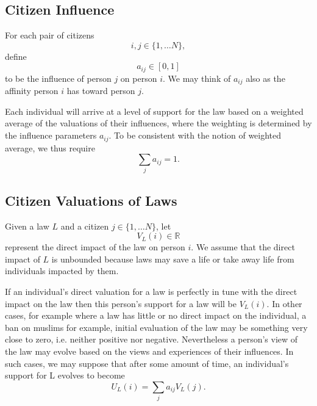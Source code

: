\subsection {Citizen Influence}
For each pair of citizens $$i,j\in\{1,\dots N\},$$ define $$a_{ij}\in [0,1]$$ to be the influence of person $j$ on person $i$.  We may think of $a_{ij}$ also as the affinity person $i$ has toward person $j$. 


Each individual will arrive at a level of support for the law based on a weighted average of the valuations of their influences, where the weighting is determined by the influence parameters $a_{ij}$. To be consistent with the notion of weighted average, we thus require $$\sum_ja_{ij}=1.$$%

\subsection{Citizen Valuations of Laws}
Given a law $L$ and a citizen $j\in\{1,\dots N\}$, %
let $$V_L(i)\in\mathbb{R}$$ represent the direct impact of the law on person $i$. We assume that the direct impact of $L$ is unbounded because laws may save a life or take away life from individuals impacted by them.

If an individual's direct valuation for a law is perfectly in tune with the direct impact on the law then this person's support for a law will be $V_L(i)$. %
In other cases, for example where a law has little or no direct impact on the individual, a ban on muslims for example, initial evaluation of the law may be something very close to zero, i.e. neither positive nor negative.  Nevertheless a person's view of the law may evolve based on the views and experiences of their influences.  In such cases, we may suppose that after some amount of time, an individual's support for L evolves to become 
\begin{equation}
\label{eq:support}
U_L(i)=\sum_ja_{ij}V_L(j).
\end{equation}


